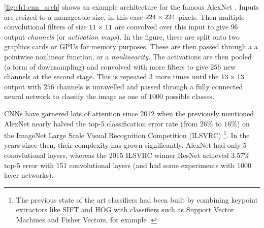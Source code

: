 \autoref{fig:ch1:cnn_arch} shows an example 
architecture for the famous AlexNet \cite{krizhevsky_imagenet_2012}. Inputs are resized to a
manageable size, in this case $224\times 224$ pixels. Then multiple convolutional
filters of size $11\times 11$ are convolved over this input to give $96$ output
\emph{channels} (or \emph{activation maps}). In the figure, these are split onto two 
graphics cards or GPUs for memory purposes. These are then passed through a
a pointwise nonlinear function, or a \emph{nonlinearity}.
The activations are then pooled (a form of downsampling) and convolved with more
filters to give $256$ new channels at the second stage. This is repeated 3 more
times until the $13\times 13$ output with $256$ channels is unravelled and passed
through a fully connected neural network to classify the image as one of $1000$
possible classes.
  
CNNs have garnered lots of attention since 2012 when the previously mentioned AlexNet
nearly halved the top-5 classification error rate (from $26\%$ to $16\%$) 
on the ImageNet Large Scale Visual Recognition Competition (ILSVRC)
\cite{russakovsky_imagenet_2014}\footnote{The previous state of
the art classifiers had been built by combining keypoint extractors like 
SIFT\cite{lowe_distinctive_2004} and HOG\cite{dalal_histograms_2005} with
classifiers such as Support Vector Machines\cite{cortes_support-vector_1995} and
Fisher Vectors\cite{sanchez_image_2013}, for example \cite{sanchez_high-dimensional_2011}.}.
In the years since then, their complexity has grown significantly. AlexNet had
only 5 conovlutional layers, whereas the 2015 ILSVRC winner ResNet \cite{he_deep_2016}
achieved 3.57\% top-5 error with 151 convolutional layers (and had some
experiments with 1000 layer networks).

